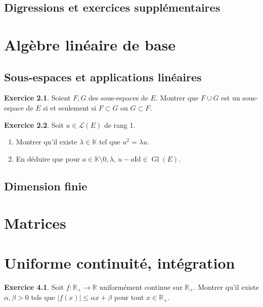 \documentclass[12pt,a4paper]{book}
\theoremstyle{definition}
\newtheorem{exo}{Exercice}[section]
\theoremstyle{remark}
\newcommand{\Id}{\mathrm{Id}}
\newcommand{\R}{\mathbb{R}}
\newcommand{\K}{\mathbb{K}}
\DeclareMathOperator{\Gl}{Gl}
\begin{document}
\section{Digressions et exercices supplémentaires}

\chapter{Algèbre linéaire de base}

\section{Sous-espaces et applications linéaires}

\begin{exo}
    Soient $F,G$ des sous-espaces de $E$. Montrer que $F \cup G$ est un sous-espace de $E$ si et seulement si $F \subset G$ ou $G \subset F$.
\end{exo}

\begin{exo}
    Soit $u\in \mathcal{L}(E)$ de rang 1.
    \begin{enumerate}
        \item Montrer qu'il existe $\lambda \in \K$ tel que $u^2 = \lambda u$.
        \item En déduire que pour $a \in \K \setminus {0,\lambda}$, $u - a \Id \in \Gl(E)$.
    \end{enumerate}
\end{exo}

\section{Dimension finie}

\chapter{Matrices}

\chapter{Uniforme continuité, intégration}

\begin{exo}
    Soit $f : \R_+ \to \R$ uniformément continue sur $\R_+$. Montrer qu'il existe $\alpha,\beta > 0$ tels que $|f(x)| \le \alpha x + \beta$ pour tout $x \in \R_+$.
\end{exo}
\end{document}
